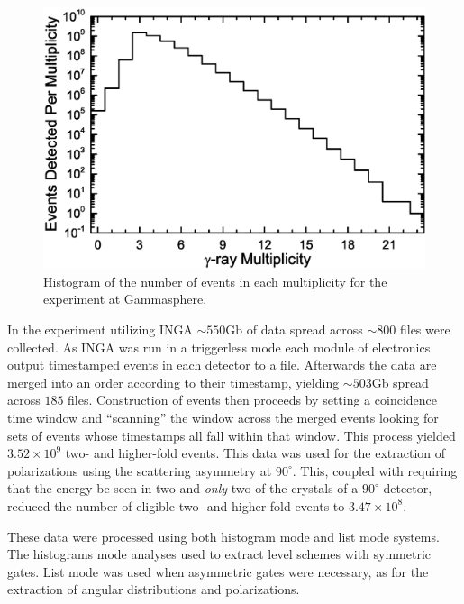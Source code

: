 \begin{figure}[h!]
	\centerline{\includegraphics[height=0.25\textheight]{./img/c3/gs_event_plot.eps}}
	\caption{Histogram of the number of events in each multiplicity for the experiment at Gammasphere.}
	\label{fig:chp3-gs_event_pattern}
\end{figure}
 
 In the experiment utilizing INGA $\sim{}550$Gb of data spread across $\sim800$ files were collected. As INGA was run in a triggerless mode each module of electronics output timestamped events in each detector to a file. Afterwards the data are merged into an order according to their timestamp, yielding $\sim{}503$Gb spread across $185$ files. Construction of events then proceeds by setting a coincidence time window and ``scanning'' the window across the merged events looking for sets of events whose timestamps all fall within that window. This process yielded $3.52\times{}10^9$ two- and higher-fold events. This data was used for the extraction of polarizations using the scattering asymmetry at $90^{\circ{}}$. This, coupled with requiring that the energy be seen in two and \emph{only} two of the crystals of a $90^{\circ{}}$ detector, reduced the number of eligible two- and higher-fold events to $3.47\times{}10^8$.
 
 These data were processed using both histogram mode\cite{radware} and list mode\cite{blue,ROOT} systems. The histograms mode analyses used to extract level schemes with symmetric gates. List mode was used when asymmetric gates were necessary, as for the extraction of angular distributions and polarizations.
 
